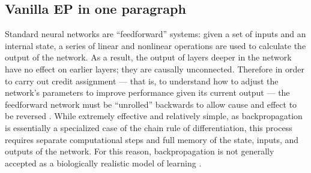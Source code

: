 \documentclass[11pt]{article}
\theoremstyle{definition}
\begin{document}
\subsection{Vanilla EP in one paragraph}
Standard neural networks are ``feedforward'' systems: given a set of
inputs and an internal state, a series of linear and nonlinear
operations are used to calculate the output of the network. As a
result, the output of layers deeper in the network have no effect on
earlier layers; they are causally unconnected. Therefore in order to
carry out credit assignment --- that is, to understand how to adjust
the network's parameters to improve performance given its current
output --- the feedforward network must be ``unrolled'' backwards to
allow cause and effect to be reversed \cite{rumelhartLearningRepresentationsBackpropagating1986}.
While extremely effective and relatively simple, as backpropagation is
essentially a specialized case of the chain rule of differentiation,
this process requires separate computational steps and full memory of
the state, inputs, and outputs of the network. For this reason,
backpropagation is not generally accepted as a biologically realistic
model of learning \cite{ororbiaBrainInspiredMachineIntelligence2023,
songCanBrainBackpropagation}.
\end{document}
